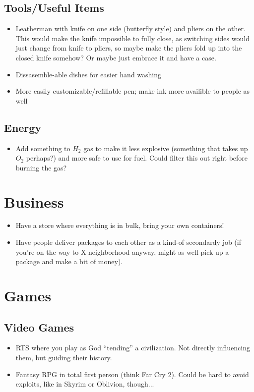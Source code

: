\documentclass{amsart}
\begin{document}
\subsection{Tools/Useful Items}
\begin{itemize}
\item{Leatherman with knife on one side (butterfly style) and pliers on the other.  This would make the knife impossible to fully close, as switching sides would just change from knife to pliers, so maybe make the pliers fold up into the closed knife somehow?  Or maybe just embrace it and have a case.}
\item{Dissasemble-able dishes for easier hand washing}
\item{More easily customizable/refillable pen; make ink more availible to people as well}
\end{itemize}
\subsection{Energy}
\begin{itemize}
\item{Add something to $H_2$ gas to make it less explosive (something that takes up $O_2$ perhaps?) and more safe to use for fuel.  Could filter this out right before burning the gas?}
\end{itemize}

\section{Business}
\begin{itemize}
\item{Have a store where everything is in bulk, bring your own containers!}
\item{Have people deliver packages to each other as a kind-of secondardy job (if you're on the way to X neighborhood anyway, might as well pick up a package and make a bit of money).}
\end{itemize}

\section{Games}
\subsection{Video Games}
\begin{itemize}
\item{RTS where you play as God ``tending'' a civilization.  Not directly influencing them, but guiding their history.}
\item{Fantasy RPG in total first person (think Far Cry 2).  Could be hard to avoid exploits, like in Skyrim or Oblivion, though...}
\end{itemize}
\end{document}
